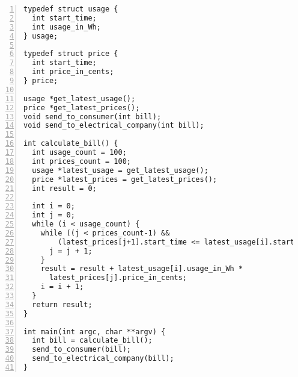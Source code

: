 \begin{lstlisting}[float, style=dlmc, numbers=left, caption={Smart meter bill calculation example}, label=example:code:calculate_bill]
typedef struct usage {
  int start_time;
  int usage_in_Wh;
} usage;

typedef struct price {
  int start_time;
  int price_in_cents;
} price;

usage *get_latest_usage();
price *get_latest_prices();
void send_to_consumer(int bill);
void send_to_electrical_company(int bill);

int calculate_bill() {
  int usage_count = 100;
  int prices_count = 100;
  usage *latest_usage = get_latest_usage();
  price *latest_prices = get_latest_prices();
  int result = 0;

  int i = 0;
  int j = 0;
  while (i < usage_count) {
    while ((j < prices_count-1) &&
        (latest_prices[j+1].start_time <= latest_usage[i].start_time)) {
      j = j + 1;
    }
    result = result + latest_usage[i].usage_in_Wh *
      latest_prices[j].price_in_cents;
    i = i + 1;
  }
  return result;
}

int main(int argc, char **argv) {
  int bill = calculate_bill();
  send_to_consumer(bill);
  send_to_electrical_company(bill);
}
\end{lstlisting}
